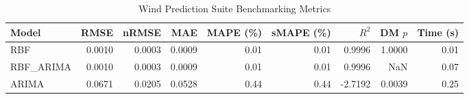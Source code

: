 \begin{table}[htbp]
\centering
\caption{Wind Prediction Suite Benchmarking Metrics}
\label{tab:wind_prediction_summary}
\begin{tabular}{lrrrrrrrr}
\toprule
Model & RMSE & nRMSE & MAE & MAPE (\%) & sMAPE (\%) & $R^2$ & DM $p$ & Time (s) \\
\midrule
RBF & 0.0010 & 0.0003 & 0.0009 & 0.01 & 0.01 & 0.9996 & 1.0000 & 0.01 \\
RBF_ARIMA & 0.0010 & 0.0003 & 0.0009 & 0.01 & 0.01 & 0.9996 & NaN & 0.07 \\
ARIMA & 0.0671 & 0.0205 & 0.0528 & 0.44 & 0.44 & -2.7192 & 0.0039 & 0.25 \\
\bottomrule
\end{tabular}
\end{table}

